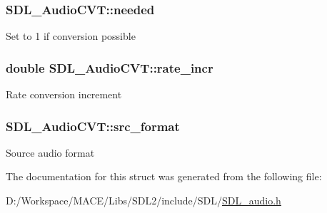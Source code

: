 \subsubsection[{\texorpdfstring{needed}{needed}}]{ S\+D\+L\+\_\+\+Audio\+C\+V\+T\+::needed}\hypertarget{struct_s_d_l___audio_c_v_t_ac600a035a48df05e14d3712fd6953ad4}{}\label{struct_s_d_l___audio_c_v_t_ac600a035a48df05e14d3712fd6953ad4}
Set to 1 if conversion possible 
\subsubsection[{\texorpdfstring{rate\+\_\+incr}{rate_incr}}]{\setlength{\rightskip}{0pt plus 5cm}double S\+D\+L\+\_\+\+Audio\+C\+V\+T\+::rate\+\_\+incr}\hypertarget{struct_s_d_l___audio_c_v_t_ad886122c23a6673073baace31bff3b6c}{}\label{struct_s_d_l___audio_c_v_t_ad886122c23a6673073baace31bff3b6c}
Rate conversion increment 
\subsubsection[{\texorpdfstring{src\+\_\+format}{src_format}}]{ S\+D\+L\+\_\+\+Audio\+C\+V\+T\+::src\+\_\+format}\hypertarget{struct_s_d_l___audio_c_v_t_a6ae81231e017105e6d5e745a51732e16}{}\label{struct_s_d_l___audio_c_v_t_a6ae81231e017105e6d5e745a51732e16}
Source audio format 

The documentation for this struct was generated from the following file\+:\begin{DoxyCompactItemize}
\item 
D\+:/\+Workspace/\+M\+A\+C\+E/\+Libs/\+S\+D\+L2/include/\+S\+D\+L/\hyperlink{_s_d_l__audio_8h}{S\+D\+L\+\_\+audio.\+h}\end{DoxyCompactItemize}
